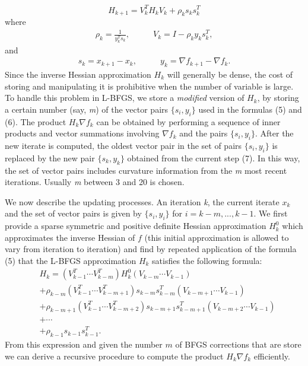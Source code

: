 \begin{equation}
H_{k+1} = V^T_{k}H_{k}V_{k}+ \rho_{k}s_{k}s^T_{k}
\end{equation}
where 
\begin{align}
\rho_{k}=\frac{1}{y^T_{k}s_{k}}, & \qquad V_{k}=I-\rho_{k}y_{k}s^T_{k}, 
\end{align} 
and 
\begin{align}
s_{k}=x_{k+1}-x_{k}, & \qquad
y_{k}=\nabla f_{k+1} - \nabla f_{k}.
\end{align}
Since the inverse Hessian approximation $H_{k}$ will generally be dense, the cost of storing and manipulating it is prohibitive when the number of variable is large. To handle this problem in L-BFGS, we store a \textit{modified} version of $H_{k}$, by storing a certain number (say, \textit{m}) of the vector pairs $\{s_{i},y_{i}\}$ used in the formulas (5) and (6). The product $H_{k}\nabla f_{k}$ can be obtained by performing a sequence of inner products and vector summations involving $\nabla f_{k}$ and the pairs $\{s_{i},y_{i}\}$. After the new iterate is computed, the oldest vector pair in the set of pairs $\{s_{i},y_{i}\}$ is replaced by the new pair $\{s_{k},y_{k}\}$ obtained from the current step (7).
In this way, the set of vector pairs includes curvature information from the \textit{m} most recent iterations. Usually \textit{m} between 3 and 20 is chosen. 

We now describe the updating processes. An iteration \textit{k}, the current iterate $x_{k}$ and the set of vector pairs is given by $\{s_{i},y_{i}\}$ for $i=k-m, ..., k-1$. We first provide a sparse symmetric and positive definite Hessian approximation $H^0_{k}$ which approximates the inverse Hessian of $f$ 
(this initial approximation is allowed to vary from iteration to iteration) and find by repeated application of the formula (5) that the L-BFGS approximation $H_{k}$ satisfies the following formula: 
\begin{equation} 
\begin{aligned}
&H_{k}=(V^T_{k-1}\cdots V^T_{k-m})H^0_{k}(V_{k-m}\cdots V_{k-1})\\           
&+\rho_{k-m}(V^T_{k-1}\cdots V^T_{k-m+1})s_{k-m}s^T_{k-m}(V_{k-m+1}\cdots V_{k-1})\\
&+\rho_{k-m+1}(V^T_{k-1}\cdots V^T_{k-m+2})s_{k-m+1}s^T_{k-m+1}(V_{k-m+2}\cdots V_{k-1})\\
&+ \cdots \\
&+\rho_{k-1}s_{k-1}s^T_{k-1}.  
\end{aligned}
\end{equation}
From this expression and given the number $m$ of BFGS corrections that are store we can derive a recursive procedure to compute the product $H_{k}\nabla f_{k}$ efficiently.

